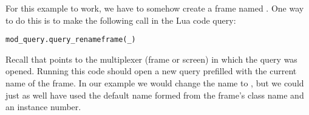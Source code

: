 For this example to work, we have to somehow create a frame named
. One way to do this is to make the following
call in the  Lua code query:

\begin{verbatim}
mod_query.query_renameframe(_)
\end{verbatim}

Recall that \code{_} points to the multiplexer (frame or screen) in which 
the query was opened. Running this code should open a new query prefilled
with the current name of the frame. In our example we would change the 
name to , but we could just as well have used the 
default name formed from the frame's class name and an instance number.
